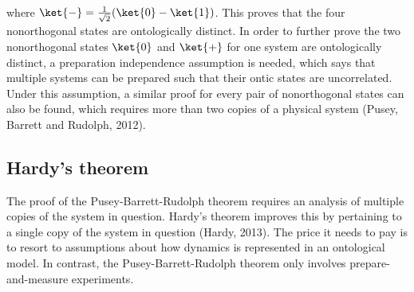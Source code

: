 \noindent where $\ket{-}={1 \over \sqrt{2}}(\ket{0}-\ket{1})$. This proves that the four nonorthogonal states are ontologically distinct. In order to further prove the two nonorthogonal states $\ket{0}$ and $\ket{+}$ for one system are ontologically distinct, a preparation independence assumption is needed, which says that multiple systems can be prepared such that their ontic states are uncorrelated. Under this assumption, a similar proof for every pair of nonorthogonal states can also be found, which requires more than two copies of a physical system (Pusey, Barrett and Rudolph, 2012).

\subsection{Hardy's theorem}

The proof of the Pusey-Barrett-Rudolph theorem requires an analysis of multiple copies of the system in question. Hardy's theorem improves this by pertaining to a single copy of the system in question (Hardy, 2013). 
The price it needs to pay is to resort to assumptions about how dynamics is represented in an ontological model. In contrast, the Pusey-Barrett-Rudolph theorem only involves prepare-and-measure experiments.

